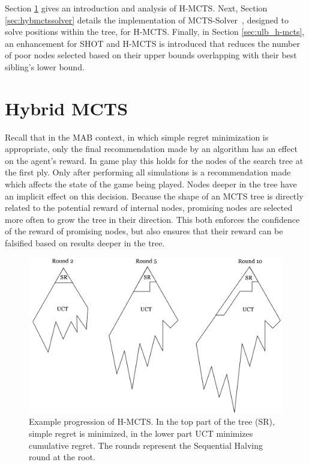\documentclass{kecsmstr}
\begin{document}
Section \ref{sec:hybmcts} gives an introduction and analysis of H-MCTS. Next, Section \ref{sec:hybmctssolver} details the implementation of MCTS-Solver~, designed to solve positions within the tree, for H-MCTS. Finally, in Section \ref{sec:ulb_h-mcts}, an enhancement for SHOT and H-MCTS is introduced that reduces the number of poor nodes selected based on their upper bounds overlapping with their best sibling's lower bound.
\newpage
\section{Hybrid MCTS}
\label{sec:hybmcts}

Recall that in the MAB context, in which simple regret minimization is appropriate, only the final recommendation made by an algorithm has an effect on the agent's reward. In game play this holds for the nodes of the search tree at the first ply. Only after performing all simulations is a recommendation made which affects the state of the game being played. Nodes deeper in the tree have an implicit effect on this decision. Because the shape of an MCTS tree is directly related to the potential reward of internal nodes, promising nodes are selected more often to grow the tree in their direction. This both enforces the confidence of the reward of promising nodes, but also ensures that their reward can be falsified based on results deeper in the tree.

\begin{figure}[ht]
	\centering
	\includegraphics[width=.8\textwidth]{img/H-MCTS.png}
	\caption{Example progression of H-MCTS. In the top part of the tree (SR), simple regret is minimized, in the lower part UCT minimizes cumulative regret. The rounds represent the Sequential Halving round at the root.}
	\label{fig:h-mcts_trees}
\end{figure}
\end{document}
